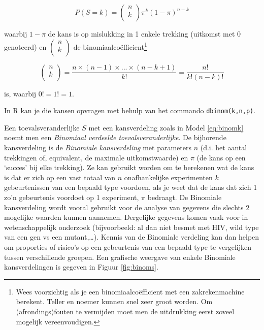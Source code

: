 \documentclass[
  12pt,dutch,coursenotes]{book}
\theoremstyle{definition}
\theoremstyle{definition}
\theoremstyle{definition}
\theoremstyle{remark}
\begin{document}
\begin{equation}
P(S=k) = \left (
\begin{array}{c}
n \\
k \\
\end{array}
\right ) \pi^k (1-\pi)^{n-k}  \label{eq:binomk}
\end{equation}

waarbij \(1-\pi\) de kans is op mislukking in 1 enkele trekking (uitkomst met 0 genoteerd) en
\(\left(\begin{array}{c} n \\ k \\ \end{array}\right)\) de binomiaalcoëfficient\footnote{Wees voorzichtig als je een binomiaalcoëfficient met een zakrekenmachine
  berekent. Teller en noemer kunnen snel zeer groot worden. Om (afrondings)fouten te vermijden moet men de uitdrukking eerst zoveel
  mogelijk vereenvoudigen.}

\begin{equation*}
\left (
\begin{array}{c}
n \\
k \\
\end{array}
\right ) = \frac{n \times (n-1) \times ...\times (n-k+1) }{ k!} = \frac{ n!}{ k!(n-k)! }
\end{equation*}

is, waarbij \(0!=1!=1\).

In R kan je die kansen opvragen met behulp van het commando \texttt{dbinom(k,n,p)}.

Een toevalsveranderlijke \(S\) met een kansverdeling zoals in Model \eqref{eq:binomk} noemt men een \emph{Binomiaal verdeelde toevalsveranderlijke}. De bijhorende kansverdeling is de \emph{Binomiale kansverdeling} met
parameters \(n\) (d.i. het aantal trekkingen of, equivalent, de maximale
uitkomstwaarde) en \(\pi\) (de kans op een `succes' bij elke trekking). Ze
kan gebruikt worden om te berekenen wat de kans is dat er zich op een vast
totaal van \(n\) onafhankelijke experimenten \(k\) gebeurtenissen van een
bepaald type voordoen, als je weet dat de kans dat zich 1 zo'n gebeurtenis
voordoet op 1 experiment, \(\pi\) bedraagt. De Binomiale kansverdeling wordt
vooral gebruikt voor de analyse van gegevens die slechts 2
mogelijke waarden kunnen aannemen.
Dergelijke gegevens komen vaak voor in wetenschappelijk onderzoek (bijvoorbeeld: al dan niet besmet met HIV, wild type van een gen vs een mutant,\ldots).
Kennis van de Binomiale verdeling kan dan helpen om proporties of risico's
op een gebeurtenis van een bepaald type te vergelijken tussen verschillende
groepen. Een grafische weergave van enkele Binomiale kansverdelingen is
gegeven in Figuur \ref{fig:binoms}.
\end{document}
